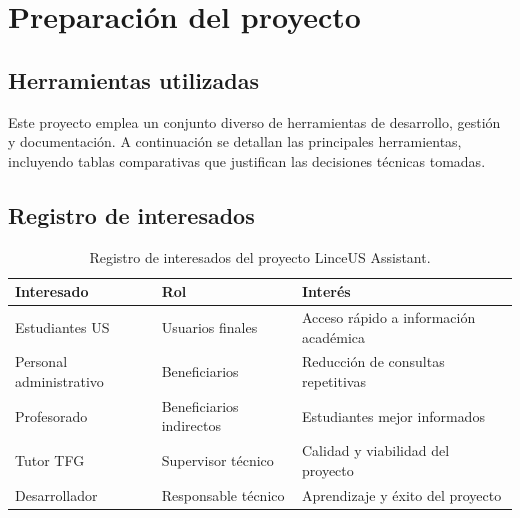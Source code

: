 
\chapter{Preparación del proyecto}\label{cap:preparacion}

\section{Herramientas utilizadas}\label{sec:herramientas-utilizadas}

Este proyecto emplea un conjunto diverso de herramientas de desarrollo, gestión y documentación. A continuación se detallan las principales herramientas, incluyendo tablas comparativas que justifican las decisiones técnicas tomadas.


\section{Registro de interesados}\label{sec:registro-interesados}


\begin{table}[h]
\centering
\begin{tabular}{|l|p{5cm}|p{3cm}|}
\hline
\textbf{Interesado} & \textbf{Rol} & \textbf{Interés} \\ \hline
Estudiantes US & Usuarios finales & Acceso rápido a información académica \\ \hline
Personal administrativo & Beneficiarios & Reducción de consultas repetitivas \\ \hline
Profesorado & Beneficiarios indirectos & Estudiantes mejor informados \\ \hline
Tutor TFG & Supervisor técnico & Calidad y viabilidad del proyecto \\ \hline
Desarrollador & Responsable técnico & Aprendizaje y éxito del proyecto \\ \hline
\end{tabular}
\caption{Registro de interesados del proyecto LinceUS Assistant.}
\label{tab:interesados}
\end{table}
